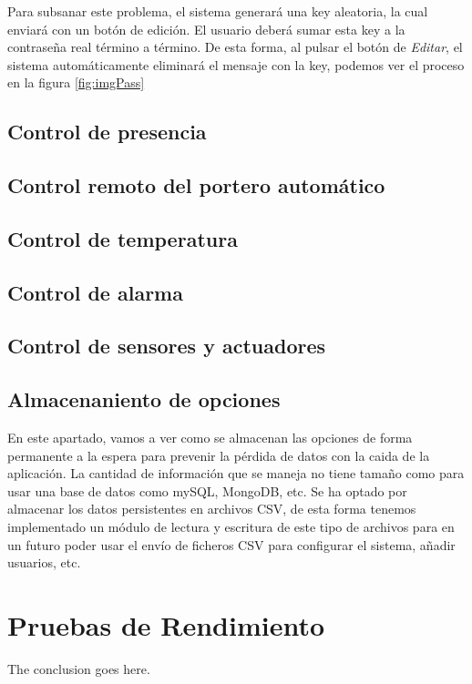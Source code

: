 \documentclass[10pt,journal,compsoc]{IEEEtran}
\begin{document}
Para subsanar este problema, el sistema generará una key aleatoria, la cual enviará con un botón de edición. El usuario deberá sumar esta key a la contraseña real término a término.
De esta forma, al pulsar el botón de \textit{Editar}, el sistema automáticamente eliminará el mensaje con la key, podemos ver el proceso en la figura \ref{fig:imgPass}

\subsection{Control de presencia}

\subsection{Control remoto del portero automático}

\subsection{Control de temperatura}

\subsection{Control de alarma}

\subsection{Control de sensores y actuadores}

\subsection{Almacenaniento de opciones}
En este apartado, vamos a ver como se almacenan las opciones de forma permanente a la espera para prevenir la pérdida de datos con la caida de la aplicación. La cantidad de información que se maneja no tiene tamaño como para usar una base de datos como mySQL, MongoDB, etc. 
Se ha optado por almacenar los datos persistentes en archivos CSV, de esta forma tenemos implementado un módulo de lectura y escritura de este tipo de archivos para en un futuro poder usar el envío de ficheros CSV para configurar el sistema, añadir usuarios, etc.


\section{Pruebas de Rendimiento}
The conclusion goes here.
\end{document}
